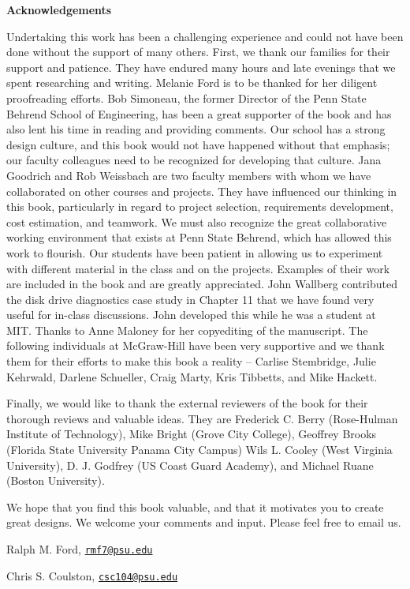 \textbf{Acknowledgements}

Undertaking this work has been a challenging experience and could not
have been done without the support of many others. First, we thank our
families for their support and patience. They have endured many hours
and late evenings that we spent researching and writing. Melanie Ford is
to be thanked for her diligent proofreading efforts. Bob Simoneau, the
former Director of the Penn State Behrend School of Engineering, has
been a great supporter of the book and has also lent his time in reading
and providing comments. Our school has a strong design culture, and this
book would not have happened without that emphasis; our faculty
colleagues need to be recognized for developing that culture. Jana
Goodrich and Rob Weissbach are two faculty members with whom we have
collaborated on other courses and projects. They have influenced our
thinking in this book, particularly in regard to project selection,
requirements development, cost estimation, and teamwork. We must also
recognize the great collaborative working environment that exists at
Penn State Behrend, which has allowed this work to flourish. Our
students have been patient in allowing us to experiment with different
material in the class and on the projects. Examples of their work are
included in the book and are greatly appreciated. John Wallberg
contributed the disk drive diagnostics case study in Chapter 11 that we
have found very useful for in-class discussions. John developed this
while he was a student at MIT. Thanks to Anne Maloney for her
copyediting of the manuscript. The following individuals at McGraw-Hill
have been very supportive and we thank them for their efforts to make
this book a reality -- Carlise Stembridge, Julie Kehrwald, Darlene
Schueller, Craig Marty, Kris Tibbetts, and Mike Hackett.

Finally, we would like to thank the external reviewers of the book for
their thorough reviews and valuable ideas. They are Frederick C. Berry
(Rose-Hulman Institute of Technology), Mike Bright (Grove City College),
Geoffrey Brooks (Florida State University Panama City Campus) Wils L.
Cooley (West Virginia University), D. J. Godfrey (US Coast Guard
Academy), and Michael Ruane (Boston University).

We hope that you find this book valuable, and that it motivates you to
create great designs. We welcome your comments and input. Please feel
free to email us.

Ralph M. Ford, \href{mailto:rmf7@psu.edu}{\nolinkurl{rmf7@psu.edu}}

Chris S. Coulston,
\href{mailto:csc104@psu.edu}{\nolinkurl{csc104@psu.edu}}
